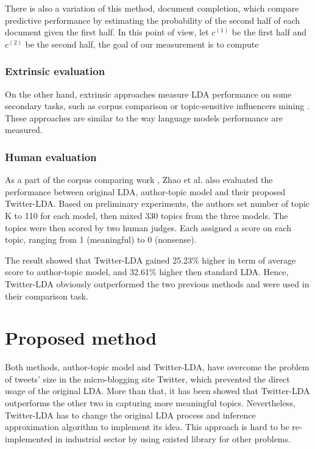 \documentclass[11pt]{article}
\begin{document}
There is also a variation of this method, document completion, which compare predictive performance by estimating the probability of the second half of each document given the first half. In this point of view, let $c^{(1)}$ be the first half and $c^{(2)}$ be the second half, the goal of our measurement is to compute

\subsubsection{Extrinsic evaluation}
On the other hand, extrinsic approaches measure LDA performance on some secondary tasks, such as corpus comparison \cite{zhao2011comparing} or topic-sensitive influencers mining \cite{Weng2010}. These approaches are similar to the way language models performance are measured.

\subsubsection{Human evaluation}

As a part of the corpus comparing work \cite{zhao2011comparing}, Zhao et al. also evaluated the performance between original LDA, author-topic model and their proposed Twitter-LDA. Based on preliminary experiments, the authors set number of topic K to 110 for each model, then mixed 330 topics from the three models. The topics were then scored by two human judges. Each assigned a score on each topic, ranging from 1 (meaningful) to 0 (nonsense).

The result showed that Twitter-LDA gained 25.23\% higher in term of average score to author-topic model, and 32.61\% higher then standard LDA. Hence, Twitter-LDA obviously outperformed the two previous methods and were used in their comparison task.


\section{Proposed method} \label{proposal}

Both methods, author-topic model and Twitter-LDA, have overcome the problem of tweets' size in the micro-blogging site Twitter, which prevented the direct usage of the original LDA. More than that, it has been showed that Twitter-LDA outperforms the other two in capturing more meaningful topics. Nevertheless, Twitter-LDA has to change the original LDA process and inference approximation algorithm to implement its idea. This approach is hard to be re-implemented in industrial sector by using existed library for other problems.
\end{document}
